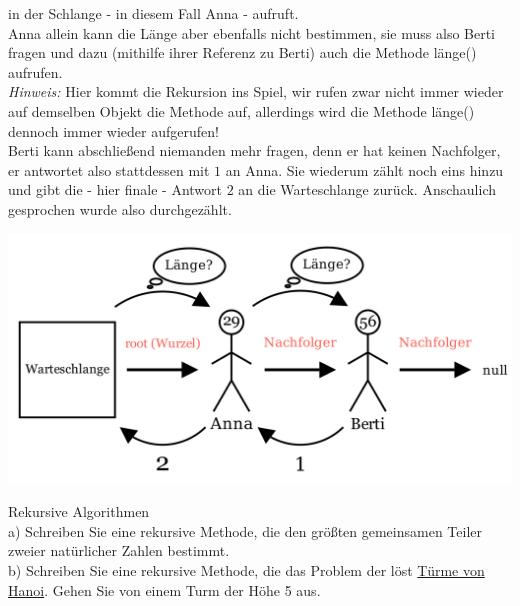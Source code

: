 \documentclass{article}
\begin{document}
in der Schlange - in diesem Fall Anna - aufruft. \\
Anna allein kann die Länge aber ebenfalls nicht bestimmen, sie muss also Berti fragen und dazu 
(mithilfe ihrer Referenz zu Berti) auch die Methode länge() aufrufen. \\
\textit{Hinweis:} Hier kommt die Rekursion ins Spiel, wir rufen zwar nicht immer wieder auf 
demselben Objekt die Methode auf, allerdings wird die Methode länge() dennoch immer wieder 
aufgerufen! \\
Berti kann abschließend niemanden mehr fragen, denn er hat keinen Nachfolger, er antwortet 
also stattdessen mit $1$ an Anna. Sie wiederum zählt noch eins hinzu und gibt die - hier finale - 
Antwort $2$ an die Warteschlange zurück. Anschaulich gesprochen wurde also  durchgezählt. 
\begin{center}
    \includegraphics[scale = 0.20]{../../media/linked_list_length2.png}
\end{center}



\begin{task}{Rekursive Algorithmen}
    \\
    a) Schreiben Sie eine rekursive Methode, die den größten gemeinsamen Teiler zweier natürlicher Zahlen bestimmt. \\
    b) Schreiben Sie eine rekursive Methode, die das Problem der  löst \href{https://www.mathematik.ch/spiele/hanoi_mit_grafik/}{Türme von Hanoi}. Gehen Sie von einem Turm der Höhe 5 aus. 
\end{task}
\end{document}

